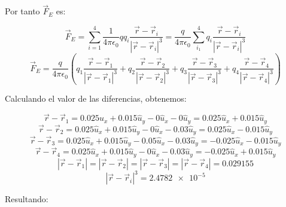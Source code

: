 \documentclass[letter,11pt]{article}
\begin{document}
\vspace{0.5cm}
Por tanto $\vec{F}_E$ es:

\begin{equation*}
    \vec{F}_E = \sum_{i=1}^4 \frac{1}{4 \pi \epsilon_0} q q_i \frac{\vec{r} - \vec{r}_i}{|\vec{r} - \vec{r}_i|^3}
              = \frac{q}{4 \pi \epsilon_0} \sum_{i_1}^4 q_i \frac{\vec{r} - \vec{r}_i}{|\vec{r} - \vec{r}_i|^3}
\end{equation*}
\begin{equation*}
    \vec{F}_E = \frac{q}{4 \pi \epsilon_0} \left(
        q_1 \frac{\vec{r} - \vec{r}_1}{|\vec{r} - \vec{r}_1|^3} +
        q_2 \frac{\vec{r} - \vec{r}_2}{|\vec{r} - \vec{r}_2|^3} +
        q_3 \frac{\vec{r} - \vec{r}_3}{|\vec{r} - \vec{r}_3|^3} +
        q_4 \frac{\vec{r} - \vec{r}_4}{|\vec{r} - \vec{r}_4|^3} \right)
\end{equation*}

\vspace{0.5cm}
Calculando el valor de las diferencias, obtenemos:

\begin{equation*}
    \vec{r} - \vec{r}_1 = 0.025 \hat{u}_x + 0.015 \hat{u}_y - 0 \hat{u}_x - 0 \hat{u}_y = 0.025 \hat{u}_x + 0.015 \hat{u}_y
\end{equation*}
\begin{equation*}
    \vec{r} - \vec{r}_2 = 0.025 \hat{u}_x + 0.015 \hat{u}_y - 0 \hat{u}_x - 0.03 \hat{u}_y = 0.025 \hat{u}_x - 0.015 \hat{u}_y
\end{equation*}
\begin{equation*}
    \vec{r} - \vec{r}_3 = 0.025 \hat{u}_x + 0.015 \hat{u}_y - 0.05 \hat{u}_x - 0.03 \hat{u}_y = - 0.025 \hat{u}_x - 0.015 \hat{u}_y
\end{equation*}
\begin{equation*}
    \vec{r} - \vec{r}_4 = 0.025 \hat{u}_x + 0.015 \hat{u}_y - 0 \hat{u}_x - 0.03 \hat{u}_y = - 0.025 \hat{u}_x + 0.015 \hat{u}_y
\end{equation*}
\begin{equation*}
    |\vec{r} - \vec{r}_1| = |\vec{r} - \vec{r}_2| = |\vec{r} - \vec{r}_3| = |\vec{r} - \vec{r}_4| = 0.029155
\end{equation*}
\begin{equation*}
    |\vec{r} - \vec{r}_i|^3 = \num{2.4782e-5}
\end{equation*}

\vspace{0.5cm}
Resultando:
\end{document}

